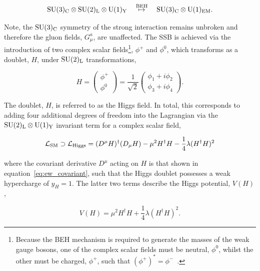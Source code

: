 \begin{equation}\label{eq:ssb}
    {\rm{SU}}(3)_{\rm{C}} \otimes {\rm{SU}}(2)_{\rm{L}} \otimes {\rm{U}}(1)_{\rm{Y}} \quad \overset{{\rm{BEH}}}{\mapsto} \quad {\rm{SU}}(3)_{\rm{C}} \otimes {\rm{U}}(1)_{\rm{EM}}.
\end{equation}

\noindent
Note, the ${\rm{SU}}(3)_{\rm{C}}$ symmetry of the strong interaction remains unbroken and therefore the gluon fields, $G^a_{\mu}$, are unaffected. The SSB is achieved via the introduction of two complex scalar fields\footnote{Because the BEH mechanism is required to generate the masses of the weak gauge bosons, one of the complex scalar fields must be neutral, $\phi^0$, whilst the other must be charged, $\phi^+$, such that $(\phi^+)^*=\phi^-$~\cite{Thomson:2013zua}.}, $\phi^+$ and $\phi^0$, which transforms as a doublet, $H$, under ${\rm{SU}}(2)_{\rm{L}}$ transformations,

\begin{equation}
    H = \begin{pmatrix}
    \phi^+ \\
    \phi^0
    \end{pmatrix} = 
    \frac{1}{\sqrt{2}}\begin{pmatrix}
    \phi_1+i\phi_2 \\
    \phi_3+i\phi_4
    \end{pmatrix}.
\end{equation}

\noindent
The doublet, $H$, is referred to as the Higgs field. In total, this corresponds to adding four additional degrees of freedom into the Lagrangian via the ${\rm{SU}(2)_{\rm{L}}}\otimes{\rm{U}}(1)_{\rm{Y}}$ invariant term for a complex scalar field,

\begin{equation}\label{eq:higgs_term}
    \mathcal{L}_{\rm{SM}} \supset \mathcal{L}_{\rm{Higgs}} = (D^\mu H)^{\dagger}(D_\mu H) - \mu^2H^{\dagger}H - \frac{1}{4}\lambda(H^{\dagger}H)^2
\end{equation}

\noindent
where the covariant derivative $D^\mu$ acting on $H$ is that shown in equation~\ref{eq:ew_covariant}, such that the Higgs doublet possesses a weak hypercharge of $y_H=1$. The latter two terms describe the Higgs potential, $V(H)$,

\begin{equation}
    V(H) = \mu^2H^{\dagger}H + \frac{1}{4}\lambda(H^{\dagger}H)^2.
\end{equation}

